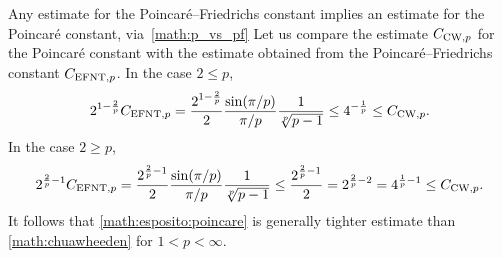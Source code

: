 \documentclass[12pt,a4paper]{article}
\begin{document}
\begin{remark}
    Any estimate for the Poincar\'e--Friedrichs constant implies an estimate for the Poincar\'e constant, via~\eqref{math:p_vs_pf}
    Let us compare the estimate $C_{{\rm CW},p}$ for the Poincar\'e constant
    with the estimate obtained from the Poincar\'e--Friedrichs constant $C_{{\rm EFNT},p}$. 
    In the case $2 \leq p$, 
    \begin{align*}
        2^{1-\frac 2 p}
        C_{{\rm EFNT},p}
        =
        \frac{ 2^{1-\frac 2 p} }{2}
        \frac{ \sin(\pi/p) }{ \pi/p }
        \frac{ 1 }{ \sqrt[p]{p-1} }
        \leq 
        4^{-\frac 1 p}
        \leq
        C_{{\rm CW},p} 
        .
    \end{align*}
    In the case $2 \geq p$, 
    \begin{align*}
        2^{\frac 2 p - 1}
        C_{{\rm EFNT},p}
        =
        \frac{ 2^{\frac 2 p - 1} }{2}
        \frac{ \sin(\pi/p) }{ \pi/p }
        \frac{ 1 }{ \sqrt[p]{p-1} }
        \leq
        \frac{ 2^{\frac 2 p-1} }{2}
        =
        2^{\frac 2 p - 2}
        =
        4^{\frac 1 p - 1}
        \leq
        C_{{\rm CW},p} 
        .
    \end{align*}
    It follows that \eqref{math:esposito:poincare} is generally tighter estimate than \eqref{math:chuawheeden} for $1 < p < \infty$.
\end{remark}
\end{document}
